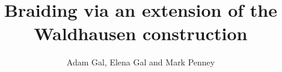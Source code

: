 \documentclass{article}
\begin{document}
\title{Braiding via an extension of the Waldhausen construction}
\author{Adam Gal, Elena Gal and Mark Penney}
\maketitle

\begin{abstract}
    
\end{abstract}

\tableofcontents












%

%


\begin{appendices}

\end{appendices}
\printbibliography
\end{document}
